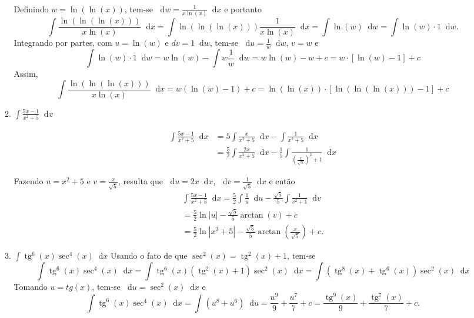 \documentclass[12pt,a4paper]{article}
\newcommand*\diff{\mathop{}\!\mathrm{d}}
\newcommand*\tg{\operatorname{tg}}
\newcommand*\abs[1]{\left|#1\right|}
\begin{document}
\begin{enumerate}
\begin{enumerate}
Definindo $w = \ln(\ln(x))$, tem-se $\diff w = \frac{1}{x \ln(x)} \diff x$ e portanto
\[
  \int \frac{ \ln(\ln(\ln(x))) }{ x \ln(x) } \diff x
= \int \ln(\ln(\ln(x))) \frac{1}{ x \ln(x) } \diff x
= \int \ln( w ) \diff w
= \int \ln( w ) \cdot 1 \diff w.
\]
Integrando por partes, com $u = \ln(w)$ e $dv = 1 \diff w$, tem-se $\diff u = \frac{1}{w} \diff w$, $v = w$ e
\[
  \int \ln( w ) \cdot 1 \diff w
= w \ln(w) - \int w \frac{1}{w} \diff w
= w \ln(w) - w + c
= w \cdot [ \ln(w) - 1 ] + c
\]
Assim,
\[
  \int \frac{ \ln(\ln(\ln(x))) }{ x \ln(x) } \diff x
= w ( \ln(w) - 1) + c
= \ln(\ln(x)) \cdot [ \ln( \ln(\ln(x)) ) - 1 ] + c
\]

\item $\displaystyle \int \frac{5x-1}{x^2+5} \diff x$

\begin{align*}
  \int \frac{5x-1}{x^2+5} \diff x
& = 5\int \frac{x}{x^2+5} \diff x
   - \int \frac{1}{x^2+5} \diff x \\
& = \frac{5}{2} \int \frac{2x}{x^2+5} \diff x
   -\frac{1}{5} \int \frac{1}{\left( \frac{x}{\sqrt{5}}\right)^2 + 1} \diff x
\end{align*}

Fazendo $u = x^2+5$ e $v = \frac{x}{\sqrt{5}}$, resulta que $\diff u = 2x \diff x$, $\diff v = \frac{1}{\sqrt{5}} \diff x$ e então
\begin{align*}
  \int \frac{5x-1}{x^2+5} \diff x
= \frac{5}{2} \int \frac{1}{u} \diff u
 -\frac{\sqrt{5}}{5} \int \frac{1}{v^2 + 1} \diff v \\
= \frac{5}{2} \ln \abs{u}
 -\frac{\sqrt{5}}{5} \arctan(v) + c \\
= \frac{5}{2} \ln \abs{x^2+5}
 -\frac{\sqrt{5}}{5} \arctan\left(\frac{x}{\sqrt{5}}\right) + c.
\end{align*}

\item $\displaystyle \int \tg^6(x) \sec^4(x)\diff x$
Usando o fato de que $\sec^2(x) = \tg^2(x) + 1$, tem-se
\[
  \int \tg^6(x) \sec^4(x)\diff x
= \int \tg^6(x) (\tg^2(x) + 1) \sec^2(x)\diff x
= \int (\tg^8(x) + \tg^6(x) ) \sec^2(x)\diff x
\]
Tomando $u = tg(x)$, tem-se $\diff u = \sec^2(x) \diff x$ e
\[
  \int \tg^6(x) \sec^4(x)\diff x
= \int (u^8 + u^6 ) \diff u
= \frac{u^9}{9} + \frac{u^7}{7} + c
= \frac{\tg^9(x)}{9} + \frac{\tg^7(x)}{7} + c.
\]


\end{enumerate}
\end{enumerate}
\end{document}
